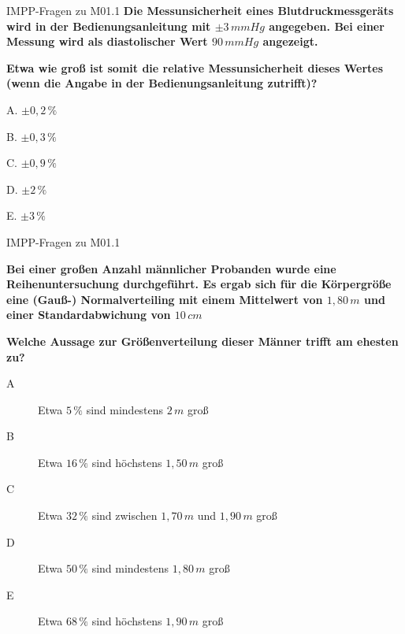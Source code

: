 \documentclass{beamer}
\begin{document}
\begin{frame}{IMPP-Fragen zu M01.1}
\textbf{Die Messunsicherheit eines Blutdruckmessgeräts wird in der Bedienungsanleitung mit \(\pm 3\, mmHg\) angegeben. Bei einer Messung wird als diastolischer Wert \(90\,mmHg\) angezeigt.}

\textbf{Etwa wie groß ist somit die relative Messunsicherheit dieses Wertes (wenn die Angabe in der Bedienungsanleitung zutrifft)?}\\[0.2 cm]


\begin{description}
\item{A.}
\(\pm 0,2\,\%\) 
\item{B.}
\(\pm 0,3\,\%\) 
\item{C.} 
\(\pm 0,9\,\% \) 
\item{D.}
\(\pm 2\,\%\) 
\item{E.}
\textcolor{theme}{\(\pm 3\,\%\) }
\end{description}
    
\end{frame}




\begin{frame}{IMPP-Fragen zu M01.1}

\textbf{Bei einer großen Anzahl männlicher Probanden wurde eine Reihenuntersuchung durchgeführt. Es ergab sich für die Körpergröße eine (Gauß-) Normalverteiling mit einem Mittelwert von \(1,80\,m\) und einer Standardabwichung von \(10\,cm\) }

\textbf{Welche Aussage zur Größenverteilung dieser Männer trifft am ehesten zu? }\\[0.2 cm]

\begin{description}
\item[A]
Etwa \(5\,\%\) sind mindestens \(2\,m\) groß
\item[B]
Etwa \(16\,\%\) sind höchstens \(1,50 \, m\) groß
\item[C] 
Etwa \(32\,\% \) sind zwischen \(1,70\,m\) und \(1,90\,m\) groß

\item[D]
Etwa \(50\,\%\) sind mindestens \(1,80\,m\) groß
\item[E]
Etwa  \(68\,\%\) sind höchstens \(1,90\,m\) groß
\end{description}

    
\end{frame}
\end{document}
